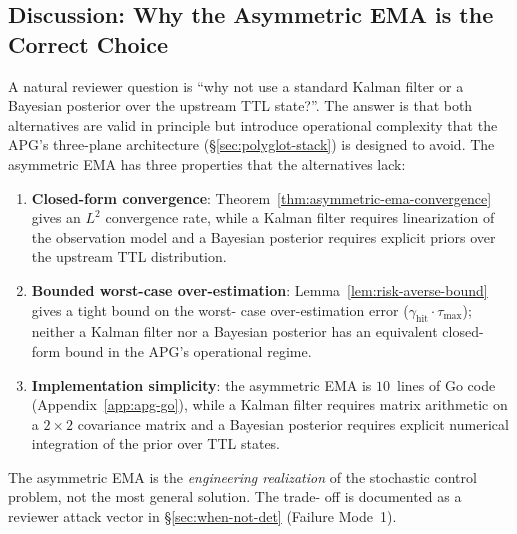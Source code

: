 \subsection{Discussion: Why the Asymmetric EMA is the Correct Choice}

A natural reviewer question is ``why not use a standard Kalman filter
or a Bayesian posterior over the upstream TTL state?''. The answer is
that both alternatives are valid in principle but introduce
operational complexity that the APG's three-plane architecture
(\S\ref{sec:polyglot-stack}) is designed to avoid. The asymmetric EMA
has three properties that the alternatives lack:

\begin{enumerate}
\item \textbf{Closed-form convergence}: Theorem~\ref{thm:asymmetric-ema-convergence}
gives an $L^2$ convergence rate, while a Kalman filter requires
linearization of the observation model and a Bayesian posterior
requires explicit priors over the upstream TTL distribution.

\item \textbf{Bounded worst-case over-estimation}:
Lemma~\ref{lem:risk-averse-bound} gives a tight bound on the worst-
case over-estimation error ($\gamma_{\text{hit}} \cdot \tau_{\max}$);
neither a Kalman filter nor a Bayesian posterior has an equivalent
closed-form bound in the APG's operational regime.

\item \textbf{Implementation simplicity}: the asymmetric EMA is
$10$~lines of Go code (Appendix~\ref{app:apg-go}), while a Kalman
filter requires matrix arithmetic on a $2 \times 2$ covariance
matrix and a Bayesian posterior requires explicit numerical
integration of the prior over TTL states.
\end{enumerate}

The asymmetric EMA is the \emph{engineering realization} of the
stochastic control problem, not the most general solution. The trade-
off is documented as a reviewer attack vector in
\S\ref{sec:when-not-det} (Failure Mode~1).

